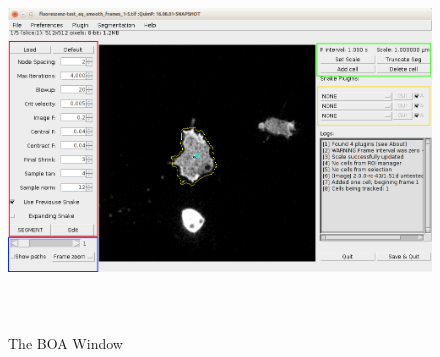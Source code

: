 \documentclass[a4paper,12pt]{article}
\begin{document}
\begin{figure}[ht]
	\centering
	\includegraphics[height=10cm]{boaWindow.png}
	\caption{The BOA Window}
	\label{boaWindow}
\end{figure}
\end{document}
